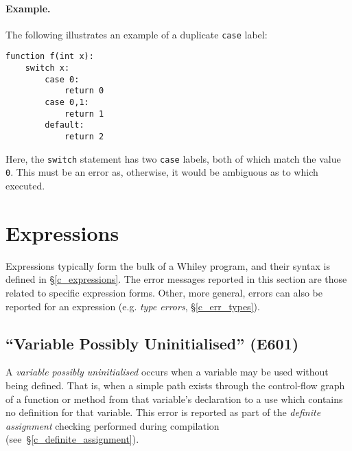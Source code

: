 \paragraph{Example.}  The following illustrates an example of a duplicate \lstinline{case} label:

\begin{lstlisting}
function f(int x):
    switch x:
        case 0:
            return 0
        case 0,1:
            return 1
        default:
            return 2
\end{lstlisting}

Here, the \lstinline{switch} statement has two \lstinline{case} labels, both of which match the value \lstinline{0}.  This must be an error as, otherwise, it would be ambiguous as to which executed.


\section{Expressions}




Expressions typically form the bulk of a Whiley program, and their syntax is defined in \S\ref{c_expressions}.  The error messages reported in this section are those related to specific expression forms.  Other, more general, errors can also be reported for an expression (e.g. {\em type errors}, \S\ref{c_err_types}).

\subsection{``Variable Possibly Uninitialised'' (E601)}
\label{c_err_var_uninitialised}
A {\em variable possibly uninitialised} occurs when a variable may be used without being defined.  That is, when a simple path exists through the control-flow graph of a function or method from that variable's declaration to a use which contains no definition for that variable.  This error is reported as part of the {\em definite assignment} checking performed during compilation (see~\S\ref{c_definite_assignment}).

